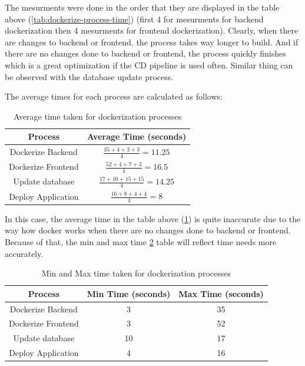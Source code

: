 \documentclass[]{VUMIFTemplateClass}
\begin{document}
The mesurments were done in the order that they are displayed in the table above (\ref{tab:dockerize-process-time}) (first 4 for mesurments for backend dockerization then 4 mesurments for frontend dockerization). 
Clearly, when there are changes to backend or frontend, the process takes way longer to build. And if there are no changes done to backend or frontend, the process quickly finishes which is a great 
optimization if the CD pipeline is used often. Similar thing can be observed with the database update process.


The average times for each process are calculated as follows:

\begin{table}[H]
    \centering
    \begin{tabular}{|c|c|}
        \hline
        \textbf{Process} & \textbf{Average Time (seconds)} \\
        \hline
        Dockerize Backend & \(\frac{35 + 4 + 3 + 3}{4} = 11.25\) \\ 
        \hline
        Dockerize Frontend & \(\frac{52 + 4 + 7 + 3}{4} = 16.5\) \\
        \hline
        Update database & \(\frac{17 + 10 + 15 + 15}{4} = 14.25\) \\ 
        \hline
        Deploy Application & \(\frac{16 + 8 + 4 + 4}{4} = 8\) \\
        \hline
    \end{tabular}
    \caption{Average time taken for dockerization processes}
    \label{tab:average-dockerize-process-time}
\end{table}

In this case, the average time in the table above (\ref{tab:average-dockerize-process-time}) is quite inaccurate due to the way how docker works when there are no changes done to backend or frontend.
Because of that, the min and max time \ref{tab:min-max-dockerize-process-time} table will reflect time needs more accurately.

\begin{table}[H]
    \centering
    \begin{tabular}{|c|c|c|}
        \hline
        \textbf{Process} & \textbf{Min Time (seconds)} & \textbf{Max Time (seconds)} \\ 
        \hline
        Dockerize Backend & 3 & 35 \\ 
        \hline
        Dockerize Frontend & 3 & 52 \\ 
        \hline
        Update database & 10 & 17 \\
        \hline
        Deploy Application & 4 & 16 \\
        \hline
    \end{tabular}
    \caption{Min and Max time taken for dockerization processes}
    \label{tab:min-max-dockerize-process-time}
\end{table}
\end{document}
